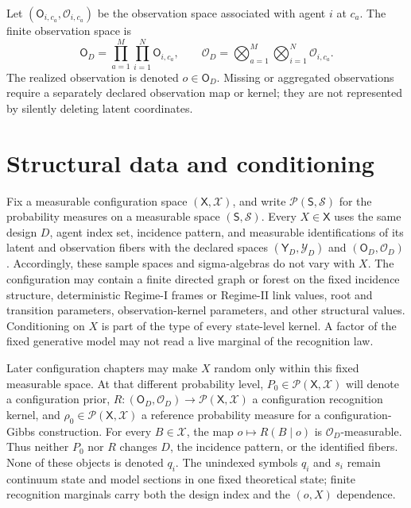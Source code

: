 Let \((\mathsf O_{i,c_a},\mathscr O_{i,c_a})\) be the observation space associated with agent \(i\) at \(c_a\). The finite observation space is
\begin{equation}
\mathsf O_D
=\prod_{a=1}^{M}\prod_{i=1}^{N}\mathsf O_{i,c_a},
\qquad
\mathscr O_D
=\bigotimes_{a=1}^{M}\bigotimes_{i=1}^{N}\mathscr O_{i,c_a}.
\label{eq:finite-observation-space}
\end{equation}
The realized observation is denoted \(o\in\mathsf O_D\). Missing or aggregated observations require a separately declared observation map or kernel; they are not represented by silently deleting latent coordinates.

\section{Structural data and conditioning}

Fix a measurable configuration space \((\mathsf X,\mathscr X)\), and write \(\mathcal P(\mathsf S,\mathscr S)\) for the probability measures on a measurable space \((\mathsf S,\mathscr S)\). Every \(X\in\mathsf X\) uses the same design \(D\), agent index set, incidence pattern, and measurable identifications of its latent and observation fibers with the declared spaces \((\mathsf Y_D,\mathscr Y_D)\) and \((\mathsf O_D,\mathscr O_D)\). Accordingly, these sample spaces and sigma-algebras do not vary with \(X\). The configuration may contain a finite directed graph or forest on the fixed incidence structure, deterministic Regime-I frames or Regime-II link values, root and transition parameters, observation-kernel parameters, and other structural values. Conditioning on \(X\) is part of the type of every state-level kernel. A factor of the fixed generative model may not read a live marginal of the recognition law.

Later configuration chapters may make \(X\) random only within this fixed measurable space. At that different probability level, \(P_0\in\mathcal P(\mathsf X,\mathscr X)\) will denote a configuration prior, \(R:(\mathsf O_D,\mathscr O_D)\to\mathcal P(\mathsf X,\mathscr X)\) a configuration recognition kernel, and \(\rho_0\in\mathcal P(\mathsf X,\mathscr X)\) a reference probability measure for a configuration-Gibbs construction. For every \(B\in\mathscr X\), the map \(o\mapsto R(B\mid o)\) is \(\mathscr O_D\)-measurable. Thus neither \(P_0\) nor \(R\) changes \(D\), the incidence pattern, or the identified fibers. None of these objects is denoted \(q_i\). The unindexed symbols \(q_i\) and \(s_i\) remain continuum state and model sections in one fixed theoretical state; finite recognition marginals carry both the design index and the \((o,X)\) dependence.

